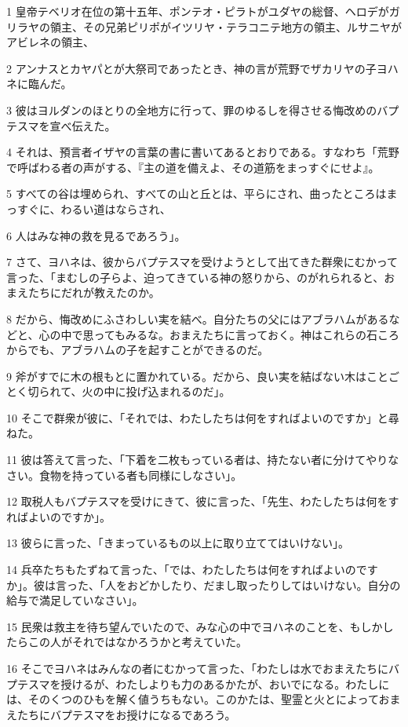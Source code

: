 \par 1 皇帝テベリオ在位の第十五年、ポンテオ・ピラトがユダヤの総督、ヘロデがガリラヤの領主、その兄弟ピリポがイツリヤ・テラコニテ地方の領主、ルサニヤがアビレネの領主、
\par 2 アンナスとカヤパとが大祭司であったとき、神の言が荒野でザカリヤの子ヨハネに臨んだ。
\par 3 彼はヨルダンのほとりの全地方に行って、罪のゆるしを得させる悔改めのバプテスマを宣べ伝えた。
\par 4 それは、預言者イザヤの言葉の書に書いてあるとおりである。すなわち「荒野で呼ばわる者の声がする、『主の道を備えよ、その道筋をまっすぐにせよ』。
\par 5 すべての谷は埋められ、すべての山と丘とは、平らにされ、曲ったところはまっすぐに、わるい道はならされ、
\par 6 人はみな神の救を見るであろう」。
\par 7 さて、ヨハネは、彼からバプテスマを受けようとして出てきた群衆にむかって言った、「まむしの子らよ、迫ってきている神の怒りから、のがれられると、おまえたちにだれが教えたのか。
\par 8 だから、悔改めにふさわしい実を結べ。自分たちの父にはアブラハムがあるなどと、心の中で思ってもみるな。おまえたちに言っておく。神はこれらの石ころからでも、アブラハムの子を起すことができるのだ。
\par 9 斧がすでに木の根もとに置かれている。だから、良い実を結ばない木はことごとく切られて、火の中に投げ込まれるのだ」。
\par 10 そこで群衆が彼に、「それでは、わたしたちは何をすればよいのですか」と尋ねた。
\par 11 彼は答えて言った、「下着を二枚もっている者は、持たない者に分けてやりなさい。食物を持っている者も同様にしなさい」。
\par 12 取税人もバプテスマを受けにきて、彼に言った、「先生、わたしたちは何をすればよいのですか」。
\par 13 彼らに言った、「きまっているもの以上に取り立ててはいけない」。
\par 14 兵卒たちもたずねて言った、「では、わたしたちは何をすればよいのですか」。彼は言った、「人をおどかしたり、だまし取ったりしてはいけない。自分の給与で満足していなさい」。
\par 15 民衆は救主を待ち望んでいたので、みな心の中でヨハネのことを、もしかしたらこの人がそれではなかろうかと考えていた。
\par 16 そこでヨハネはみんなの者にむかって言った、「わたしは水でおまえたちにバプテスマを授けるが、わたしよりも力のあるかたが、おいでになる。わたしには、そのくつのひもを解く値うちもない。このかたは、聖霊と火とによっておまえたちにバプテスマをお授けになるであろう。
